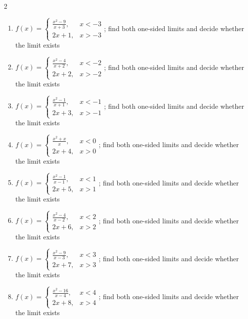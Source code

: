 \documentclass[11pt,oneside]{book}
\begin{document}
\begin{multicols}{2}
\begin{enumerate}[leftmargin=*,label=\textbf{\arabic*.},itemsep=0.65\baselineskip]
\item $f(x)=\begin{cases} \frac{x^{2} - 9}{x + 3}, & x<-3\\ 2 x + 1, & x>-3 \end{cases}$; find both one-sided limits and decide whether the limit exists
\item $f(x)=\begin{cases} \frac{x^{2} - 4}{x + 2}, & x<-2\\ 2 x + 2, & x>-2 \end{cases}$; find both one-sided limits and decide whether the limit exists
\item $f(x)=\begin{cases} \frac{x^{2} - 1}{x + 1}, & x<-1\\ 2 x + 3, & x>-1 \end{cases}$; find both one-sided limits and decide whether the limit exists
\item $f(x)=\begin{cases} \frac{x^{2} + x}{x}, & x<0\\ 2 x + 4, & x>0 \end{cases}$; find both one-sided limits and decide whether the limit exists
\item $f(x)=\begin{cases} \frac{x^{2} - 1}{x - 1}, & x<1\\ 2 x + 5, & x>1 \end{cases}$; find both one-sided limits and decide whether the limit exists
\item $f(x)=\begin{cases} \frac{x^{2} - 4}{x - 2}, & x<2\\ 2 x + 6, & x>2 \end{cases}$; find both one-sided limits and decide whether the limit exists
\item $f(x)=\begin{cases} \frac{x^{2} - 9}{x - 3}, & x<3\\ 2 x + 7, & x>3 \end{cases}$; find both one-sided limits and decide whether the limit exists
\item $f(x)=\begin{cases} \frac{x^{2} - 16}{x - 4}, & x<4\\ 2 x + 8, & x>4 \end{cases}$; find both one-sided limits and decide whether the limit exists

\end{enumerate}
\end{multicols}
\end{document}
